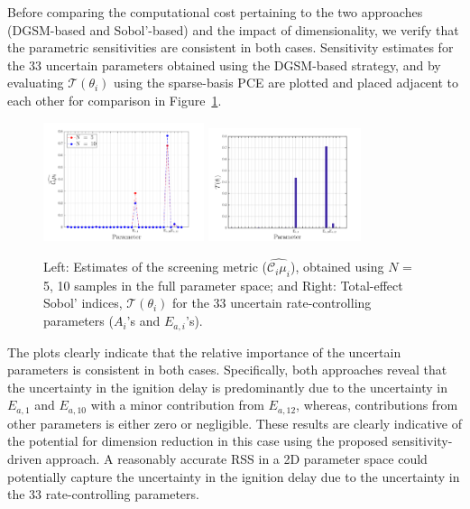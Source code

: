 Before comparing the computational cost pertaining to the two approaches (DGSM-based and 
Sobol'-based) and the impact of dimensionality, we verify that the parametric sensitivities are
consistent in both cases. Sensitivity estimates for the 33 uncertain parameters obtained
using the DGSM-based strategy, and by evaluating $\mathcal{T}(\theta_i)$ 
using the sparse-basis PCE are plotted and placed adjacent to each other for comparison
in Figure~\ref{fig:sense33D}.
%
\begin{figure}[htbp]
 \begin{center}
  \includegraphics[width=0.42\textwidth]{./Figures/ub33D}
  \includegraphics[width=0.40\textwidth]{./Figures/sens_kinetics33D}
\caption{
Left: Estimates of the screening metric ($\widehat{\mathcal{C}_i\mu_i}$), 
obtained using $N$ = 5, 10 samples in the full parameter space; and
Right: Total-effect Sobol' indices, $\mathcal{T}(\theta_i)$ for the 33 uncertain rate-controlling
parameters ($A_i$'s and $E_{a,i}$'s).}
\label{fig:sense33D}
\end{center}
\end{figure}
%
The plots clearly indicate that the relative importance of the uncertain parameters is
consistent in both cases. Specifically, both approaches reveal that the uncertainty in
the ignition delay is predominantly due to the uncertainty in $E_{a,1}$ and $E_{a,10}$ with a 
minor contribution from $E_{a,12}$, whereas, contributions from other parameters is either zero
or negligible. These results are clearly indicative of the potential for dimension reduction in this
case using the proposed sensitivity-driven approach. A reasonably accurate RSS in a 2D
parameter space could potentially capture the uncertainty in the ignition delay due to the
uncertainty in the 33 rate-controlling parameters.

